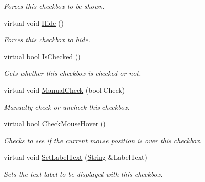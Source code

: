 \begin{DoxyCompactItemize}
\begin{DoxyCompactList}\small\item\em Forces this checkbox to be shown. \item\end{DoxyCompactList}\item 
\hypertarget{classphys_1_1UI_1_1CheckBox_ad58dd6a164e3a3b394899955b612659e}{
virtual void \hyperlink{classphys_1_1UI_1_1CheckBox_ad58dd6a164e3a3b394899955b612659e}{Hide} ()}
\label{dd/d10/classphys_1_1UI_1_1CheckBox_ad58dd6a164e3a3b394899955b612659e}

\begin{DoxyCompactList}\small\item\em Forces this checkbox to hide. \item\end{DoxyCompactList}\item 
virtual bool \hyperlink{classphys_1_1UI_1_1CheckBox_acf01a9b19251212fb626d022d02b53d5}{IsChecked} ()
\begin{DoxyCompactList}\small\item\em Gets whether this checkbox is checked or not. \item\end{DoxyCompactList}\item 
virtual void \hyperlink{classphys_1_1UI_1_1CheckBox_a3720c3f110a3594e45a8115c21deba00}{ManualCheck} (bool Check)
\begin{DoxyCompactList}\small\item\em Manually check or uncheck this checkbox. \item\end{DoxyCompactList}\item 
virtual bool \hyperlink{classphys_1_1UI_1_1CheckBox_a3c9b10c692dfb62dedbd091dac12c115}{CheckMouseHover} ()
\begin{DoxyCompactList}\small\item\em Checks to see if the current mouse position is over this checkbox. \item\end{DoxyCompactList}\item 
virtual void \hyperlink{classphys_1_1UI_1_1CheckBox_aa25bc0f39dca43c00585d107e9a3bcb7}{SetLabelText} (\hyperlink{namespacephys_aa03900411993de7fbfec4789bc1d392e}{String} \&LabelText)
\begin{DoxyCompactList}\small\item\em Sets the text label to be displayed with this checkbox. \item\end{DoxyCompactList}\item 

\end{DoxyCompactItemize}
